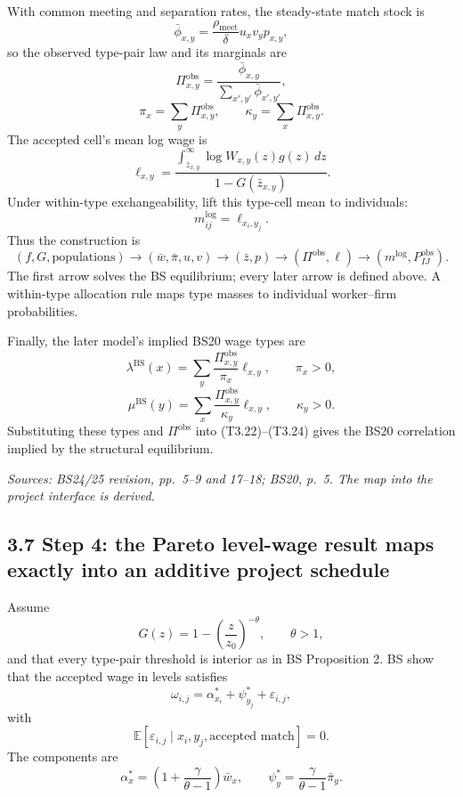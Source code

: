 \documentclass[11pt]{article}
\begin{document}
With common meeting and separation rates, the steady-state match stock is
\[
\bar\phi_{x,y}
=
\frac{\rho_{\mathrm{meet}}}{\delta}u_xv_yp_{x,y},
\tag{T3.35}
\]
so the observed type-pair law and its marginals are
\[
\Pi^{\mathrm{obs}}_{x,y}
=
\frac{\bar\phi_{x,y}}{\sum_{x',y'}\bar\phi_{x',y'}},
\tag{T3.36}
\]
\[
\pi_x=\sum_y\Pi^{\mathrm{obs}}_{x,y},
\qquad
\kappa_y=\sum_x\Pi^{\mathrm{obs}}_{x,y}.
\tag{T3.36a}
\]
The accepted cell's mean log wage is
\[
\ell_{x,y}
=
\frac{\displaystyle\int_{\bar z_{x,y}}^\infty
\log W_{x,y}(z)g(z)\,dz}
{1-G(\bar z_{x,y})}.
\tag{T3.38}
\]
Under within-type exchangeability, lift this type-cell mean to individuals:
\[
m^{\log}_{ij}=\ell_{x_i,y_j}.
\tag{T3.39}
\]
Thus the construction is
\[
(f,G,\text{populations})
\longrightarrow
(\bar w,\bar\pi,u,v)
\longrightarrow
(\bar z,p)
\longrightarrow
(\Pi^{\mathrm{obs}},\ell)
\longrightarrow
(m^{\log},P^{\mathrm{obs}}_{IJ}).
\tag{T3.40}
\]
The first arrow solves the BS equilibrium; every later arrow is defined
above.  A within-type allocation rule maps type masses to individual
worker--firm probabilities.

Finally, the later model's implied BS20 wage types are
\[
\lambda^{\mathrm{BS}}(x)
=
\sum_y\frac{\Pi^{\mathrm{obs}}_{x,y}}{\pi_x}\ell_{x,y},
\qquad \pi_x>0,
\tag{T3.40a}
\]
\[
\mu^{\mathrm{BS}}(y)
=
\sum_x\frac{\Pi^{\mathrm{obs}}_{x,y}}{\kappa_y}\ell_{x,y},
\qquad \kappa_y>0.
\tag{T3.40b}
\]
Substituting these types and \(\Pi^{\mathrm{obs}}\) into
(T3.22)--(T3.24) gives the BS20 correlation implied by the structural
equilibrium.

\textit{Sources: BS24/25 revision, pp.\ 5--9 and 17--18; BS20, p.\ 5.
The map into the project interface is derived.}

\subsection{3.7 Step 4: the Pareto level-wage result maps exactly into an additive project schedule}

Assume
\[
G(z)=1-\left(\frac{z}{z_0}\right)^{-\theta},
\qquad
\theta>1,
\tag{T3.41}
\]
and that every type-pair threshold is interior as in BS Proposition 2.  BS
show that the accepted wage in levels satisfies
\[
\omega_{i,j}
=
\alpha^*_{x_i}+\psi^*_{y_j}+\varepsilon_{i,j},
\tag{T3.42}
\]
with
\[
\mathbb E[
\varepsilon_{i,j}\mid x_i,y_j,\text{accepted match}
]=0.
\tag{T3.43}
\]
The components are
\[
\alpha_x^*
=
\left(1+\frac{\gamma}{\theta-1}\right)\bar w_x,
\qquad
\psi_y^*
=
\frac{\gamma}{\theta-1}\bar\pi_y.
\tag{T3.44}
\]
\end{document}
